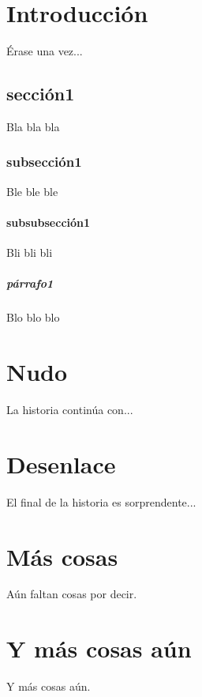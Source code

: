 \documentclass[a4paper,openright,12pt]{book}
\begin{document}
\chapter{Introducción}
\label{cap.introduccion}
Érase una vez...
\section{sección1}
Bla bla bla
\subsection{subsección1}
Ble ble ble
\subsubsection{subsubsección1}
Bli bli bli
\paragraph{párrafo1}
Blo blo blo

\chapter{Nudo}
\label{cap.nudo}
La historia continúa con...

\chapter{Desenlace}
\label{cap.desenlace}
El final de la historia es sorprendente...

\appendix
\chapter{Más cosas}
\label{aped.A}
Aún faltan cosas por decir.

\chapter{Y más cosas aún}
\label{aped.B}
Y más cosas aún.

\cleardoublepage
{}
\end{document}
